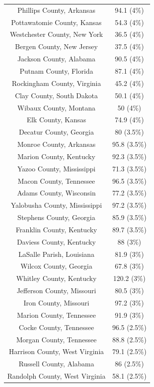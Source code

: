 \begin{table}[ht]
\begin{tabular}{cc}
  Phillips County, Arkansas & 94.1 (4\%) \\ 
  Pottawatomie County, Kansas & 54.3 (4\%) \\ 
  Westchester County, New York & 36.5 (4\%) \\ 
  Bergen County, New Jersey & 37.5 (4\%) \\ 
  Jackson County, Alabama & 90.5 (4\%) \\ 
  Putnam County, Florida & 87.1 (4\%) \\ 
  Rockingham County, Virginia & 45.2 (4\%) \\ 
  Clay County, South Dakota & 50.1 (4\%) \\ 
  Wibaux County, Montana & 50 (4\%) \\ 
  Elk County, Kansas & 74.9 (4\%) \\ 
  Decatur County, Georgia & 80 (3.5\%) \\ 
  Monroe County, Arkansas & 95.8 (3.5\%) \\ 
  Marion County, Kentucky & 92.3 (3.5\%) \\ 
  Yazoo County, Mississippi & 71.3 (3.5\%) \\ 
  Macon County, Tennessee & 96.5 (3.5\%) \\ 
  Adams County, Wisconsin & 77.2 (3.5\%) \\ 
  Yalobusha County, Mississippi & 97.2 (3.5\%) \\ 
  Stephens County, Georgia & 85.9 (3.5\%) \\ 
  Franklin County, Kentucky & 89.7 (3.5\%) \\ 
  Daviess County, Kentucky & 88 (3\%) \\ 
  LaSalle Parish, Louisiana & 81.9 (3\%) \\ 
  Wilcox County, Georgia & 67.8 (3\%) \\ 
  Whitley County, Kentucky & 120.2 (3\%) \\ 
  Jefferson County, Missouri & 80.5 (3\%) \\ 
  Iron County, Missouri & 97.2 (3\%) \\ 
  Marion County, Tennessee & 91.9 (3\%) \\ 
  Cocke County, Tennessee & 96.5 (2.5\%) \\ 
  Morgan County, Tennessee & 88.8 (2.5\%) \\ 
  Harrison County, West Virginia & 79.1 (2.5\%) \\ 
  Russell County, Alabama & 86 (2.5\%) \\ 
  Randolph County, West Virginia & 58.1 (2.5\%) \\ 

\end{tabular}
\end{table}
